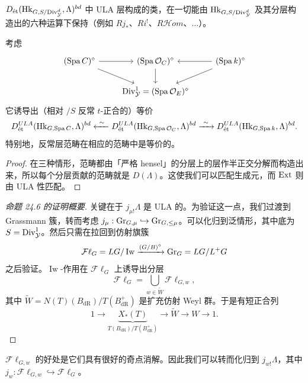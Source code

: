 \begin{corollary}
$D_{\et}(\mathrm{Hk}_{G,S/\Div^d_{\cY}},\Lambda)^{bd}$ 中 ULA 层构成的类，在一切能由 $\mathrm{Hk}_{G,S/\Div^d_{\cY}}$ 及其分层构造出的六种运算下保持（例如 $Rj_*$、$Ri^!$、$R\mathcal{H}om$、$\ldots$）。
\end{corollary}

\begin{corollary}
考虑
\[
\begin{tikzcd}
(\Spa C)^\diamond \arrow[r] \arrow[dr] & (\Spa\cO_C)^\diamond \arrow[d] & (\Spa k)^\diamond \arrow[l] \arrow[dl] \\
& \Div^1_{\cY}=(\Spa\cO_E)^\diamond
\end{tikzcd}
\]
它诱导出（相对 $/S$ 反常 $t$-正合的）等价
\[
D^{ULA}_{\et}(\mathrm{Hk}_{G,\Spa C},\Lambda)^{bd}\xleftarrow{\ \sim\ }D^{ULA}_{\et}(\mathrm{Hk}_{G,\Spa\cO_C},\Lambda)^{bd}\xrightarrow{\ \sim\ }D^{ULA}_{\et}(\mathrm{Hk}_{G,\Spa k},\Lambda)^{bd}.
\]
特别地，反常层范畴在相应的范畴中是等价的。
\end{corollary}

\begin{proof}
在三种情形，范畴都由「严格 hensel」的分层上的层作半正交分解而构造出来，所以每个分层贡献的范畴就是 $D(\Lambda)$。这使我们可以匹配生成元，而 $\Ext$ 则由 ULA 性匹配。
\end{proof}

\begin{proof}[命题 24.6 的证明概要]
关键在于 $j_{\mu!}\Lambda$ 是 ULA 的。为验证这一点，我们过渡到 Grassmann 簇，转而考虑 $j_\mu:\Gr_{G,\mu}\hookrightarrow\Gr_{G,\le\mu}$。可以化归到泛情形，其中底为 $S=\Div^1_{\cY}$。然后只需在拉回到仿射旗簇
\[
\mathcal{F}\ell_G=LG/\operatorname{Iw}\xrightarrow{(G/B)^\diamond}\Gr_G=LG/L^+G
\]
之后验证。$\operatorname{Iw}$-作用在 $\mathcal{F}\ell_G$ 上诱导出分层
\[
\mathcal{F}\ell_G=\bigcup_{w\in\widetilde W}\mathcal{F}\ell_{G,w},
\]
其中 $\widetilde W=N(T)(B_{\mathrm{dR}})/T(B^+_{\mathrm{dR}})$ 是扩充仿射 Weyl 群。于是有短正合列
\[
1\to\underbrace{X_*(T)}_{T(B_{\mathrm{dR}})/T(B^+_{\mathrm{dR}})}\to\widetilde W\to W\to1.
\]
\end{proof}


$\mathcal{F}\ell_{G,w}$ 的好处是它们具有很好的奇点消解。因此我们可以转而化归到 $j_{w!}\Lambda$，其中 $j_w:\mathcal{F}\ell_{G,w}\hookrightarrow\mathcal{F}\ell_G$。

